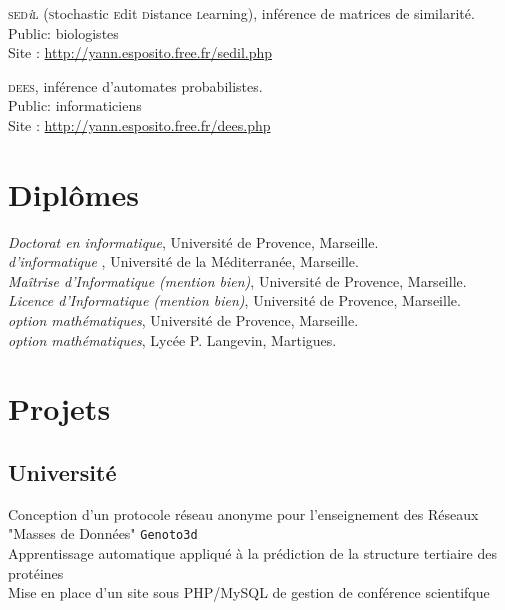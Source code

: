 \textsc{sed}\textit{\footnotesize i}\textsc{l} ({\textsc{\color{darkred}s}tochastic 
\textsc{\color{darkred}e}dit
\textsc{\color{darkred}d}{\color{darkred}i}stance
\textsc{\color{darkred}l}earning}), 
inférence de matrices de similarité.\\
{\footnotesize \phantom{espace}Public: biologistes}\\
{\footnotesize \phantom{espace}Site : \href{http://yann.esposito.free.fr/sedil.php}{http://yann.esposito.free.fr/sedil.php}}

\textsc{dees}, inférence d'automates probabilistes.\\
{\footnotesize \phantom{espace}Public: informaticiens}\\
{\footnotesize \phantom{espace}Site : \href{http://yann.esposito.free.fr/dees.php}{http://yann.esposito.free.fr/dees.php}}

\section*{Diplômes}

\noindent{}\emph{Doctorat en informatique}, Université de Provence, Marseille.\\
\noindent{}\emph{ d'informatique} , Université de la Méditerranée, Marseille.\\
\noindent{}\emph{Maîtrise d'Informatique {\footnotesize(mention bien)}}, Université de Provence, Marseille.\\
\noindent{}\emph{Licence d'Informatique {\footnotesize(mention bien)}}, Université de Provence, Marseille.\\
\noindent{}\emph{ {\footnotesize option mathématiques}}, Université de Provence, Marseille.\\
\noindent{}\emph{ {\footnotesize option mathématiques}}, Lycée P. Langevin, Martigues.

\section*{Projets}

\subsection*{Université}

\noindent{}Conception d'un protocole réseau anonyme pour l'enseignement des Réseaux\\
 "Masses de Données" \texttt{Genoto3d}\\
{\phantom{es}\footnotesize Apprentissage automatique appliqué à la prédiction de la structure tertiaire des protéines}\\
Mise en place d'un site sous PHP/MySQL de gestion de conférence scientifque

